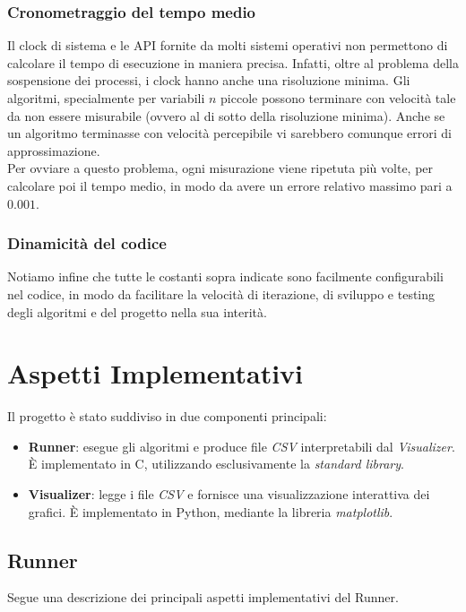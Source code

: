 \documentclass{article}
\begin{document}
        \subsubsection{Cronometraggio del tempo medio}
            Il clock di sistema e le API fornite da molti sistemi operativi non permettono di calcolare il tempo di esecuzione in maniera precisa. Infatti, oltre al problema della sospensione dei processi, i clock hanno anche una risoluzione minima. Gli algoritmi, specialmente per variabili $n$ piccole possono terminare con velocità tale da non essere misurabile (ovvero al di sotto della risoluzione minima). Anche se un algoritmo terminasse con velocità percepibile vi sarebbero comunque errori di approssimazione.\\

            Per ovviare a questo problema, ogni misurazione viene ripetuta più volte, per calcolare poi il tempo medio, in modo da avere un errore relativo massimo pari a $0.001$.

        \subsubsection{Dinamicità del codice}
            Notiamo infine che tutte le costanti sopra indicate sono facilmente configurabili nel codice, in modo da facilitare la velocità di iterazione, di sviluppo e testing degli algoritmi e del progetto nella sua interità.

\section{Aspetti Implementativi}
    Il progetto è stato suddiviso in due componenti principali:
    \begin{itemize}
        \item \textbf{Runner}: esegue gli algoritmi e produce file \textit{CSV} interpretabili dal \textit{Visualizer}. È implementato in C, utilizzando esclusivamente la \textit{standard library}.
        \item \textbf{Visualizer}: legge i file \textit{CSV} e fornisce una visualizzazione interattiva dei grafici. È implementato in Python, mediante la libreria \textit{matplotlib}.
    \end{itemize}

    \subsection{Runner}
        Segue una descrizione dei principali aspetti implementativi del Runner.
\end{document}
